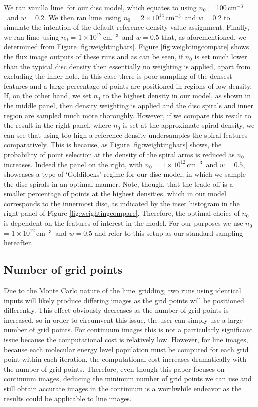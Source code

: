 \documentclass[fleqn,usenatbib]{mnras}
\newcommand{\nnone}{$n_0$ = 100$\,\mathrm{cm^{-3}}$}
\newcommand{\nfull}{$n_0$ = $2\times10^{14}\,\mathrm{cm^{-3}}$}
\newcommand{\nzero}{$n_0$ = $1\times10^{12}\,\mathrm{cm^{-3}}$}
\newcommand{\lime}{{\sc lime}}
\begin{document}
We ran vanilla \lime\ for our disc model, which equates to using \nnone\ and $w = 0.2$. We then ran \lime\ using \nfull\ and $w = 0.2$ to simulate the intention of the default reference density value assignment. Finally, we ran \lime\ using \nzero\ and $w = 0.5$ that, as aforementioned, we determined from Figure \ref{fig:weightingbars}. Figure \ref{fig:weightingcompare} shows the flux image outputs of these runs and as can be seen, if $n_0$ is set much lower than the typical disc density then essentially no weighting is applied, apart from excluding the inner hole. In this case there is poor sampling of the densest features and a large percentage of points are positioned in regions of low density. If, on the other hand, we set $n_0$ to the highest density in our model, as shown in the middle panel, then density weighting is applied and the disc spirals and inner region are sampled much more thoroughly. However, if we compare this result to the result in the right panel, where $n_0$ is set at the approximate spiral density, we can see that using too high a reference density undersamples the spiral features comparatively. This is because, as Figure \ref{fig:weightingbars} shows, the probability of point selection at the density of the spiral arms is reduced as $n_0$ increases. Indeed the panel on the right, with \nzero\ and $w = 0.5$, showcases a type of `Goldilocks' regime for our disc model, in which we sample the disc spirals in an optimal manner. Note, though, that the trade-off is a smaller percentage of points at the highest densities, which in our model corresponds to the innermost disc, as indicated by the inset histogram in the right panel of Figure \ref{fig:weightingcompare}. Therefore, the optimal choice of $n_0$ is dependent on the features of interest in the model. For our purposes we use \nzero\ and $w = 0.5$ and refer to this setup as our standard sampling hereafter.

\subsection{Number of grid points}
\label{sec:numpoints}

Due to the Monte Carlo nature of the \lime\ gridding, two runs using identical inputs will likely produce differing images as the grid points will be positioned differently. This effect obviously decreases as the number of grid points is increased, so in order to circumvent this issue, the user can simply use a large number of grid points. For continuum images this is not a particularly significant issue because the computational cost is relatively low. However, for line images, because each molecular energy level population must be computed for each grid point within each iteration, the computational cost increases dramatically with the number of grid points. Therefore, even though this paper focuses on continuum images, deducing the minimum number of grid points we can use and still obtain accurate images in the continuum is a worthwhile endeavor as the results could be applicable to line images.
\end{document}
